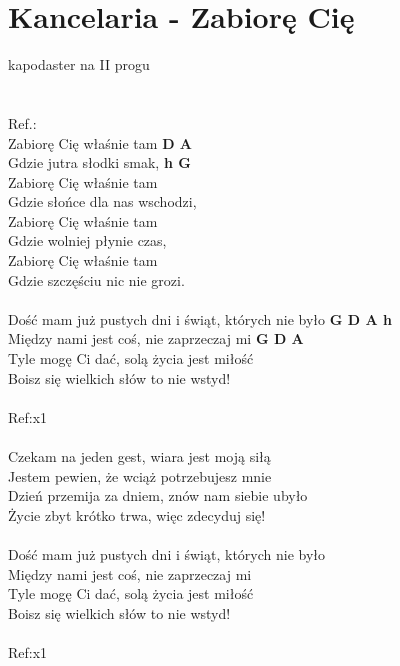 \section{Kancelaria - Zabiorę Cię}
kapodaster na II progu\\
\\
\\
Ref.:\\
Zabiorę Cię właśnie tam		\textbf{D A}\\
Gdzie jutra słodki smak,  	\textbf{h G}\\
Zabiorę Cię właśnie tam	\\
Gdzie słońce dla nas wschodzi, \\
Zabiorę Cię właśnie tam \\
Gdzie wolniej płynie czas, \\
Zabiorę Cię właśnie tam \\
Gdzie szczęściu nic nie grozi. \\
\\
Dość mam już pustych dni i świąt, których nie było  	\textbf{G D A h}\\
Między nami jest coś, nie zaprzeczaj mi  		\textbf{G D A}\\
Tyle mogę Ci dać, solą życia jest miłość \\
Boisz się wielkich słów to nie wstyd! \\
\\
Ref:x1 \\
\\
Czekam na jeden gest, wiara jest moją siłą \\
Jestem pewien, że wciąż potrzebujesz mnie \\
Dzień przemija za dniem, znów nam siebie ubyło \\
Życie zbyt krótko trwa, więc zdecyduj się! \\
\\
Dość mam już pustych dni i świąt, których nie było \\
Między nami jest coś, nie zaprzeczaj mi \\
Tyle mogę Ci dać, solą życia jest miłość \\
Boisz się wielkich słów to nie wstyd! \\
\\
Ref:x1\\
\newpage


